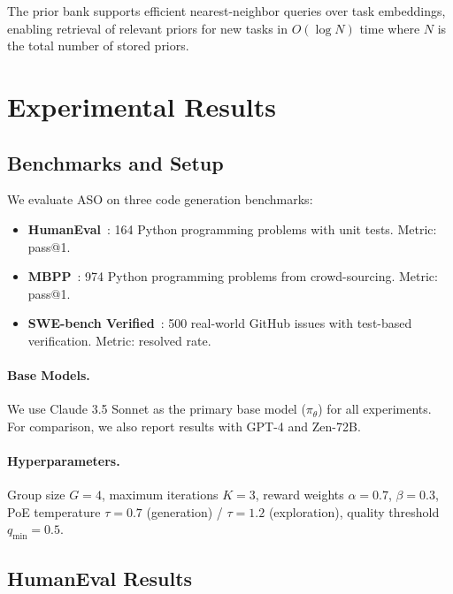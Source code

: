 \documentclass[11pt]{article}
\begin{document}
The prior bank supports efficient nearest-neighbor queries over task embeddings,
enabling retrieval of relevant priors for new tasks in $O(\log N)$ time where
$N$ is the total number of stored priors.

\section{Experimental Results}
\label{sec:experiments}

\subsection{Benchmarks and Setup}

We evaluate ASO on three code generation benchmarks:

\begin{itemize}[leftmargin=1.5em]
    \item \textbf{HumanEval}~\cite{chen2021evaluating}: 164 Python programming
          problems with unit tests. Metric: pass@1.
    \item \textbf{MBPP}~\cite{austin2021program}: 974 Python programming
          problems from crowd-sourcing. Metric: pass@1.
    \item \textbf{SWE-bench Verified}~\cite{jimenez2024swebench}: 500
          real-world GitHub issues with test-based verification. Metric:
          resolved rate.
\end{itemize}

\paragraph{Base Models.}
We use Claude 3.5 Sonnet as the primary base model ($\pi_\theta$) for all
experiments. For comparison, we also report results with GPT-4 and Zen-72B.

\paragraph{Hyperparameters.}
Group size $G = 4$, maximum iterations $K = 3$, reward weights
$\alpha = 0.7$, $\beta = 0.3$, PoE temperature $\tau = 0.7$ (generation) /
$\tau = 1.2$ (exploration), quality threshold $q_{\min} = 0.5$.

\subsection{HumanEval Results}
\end{document}
